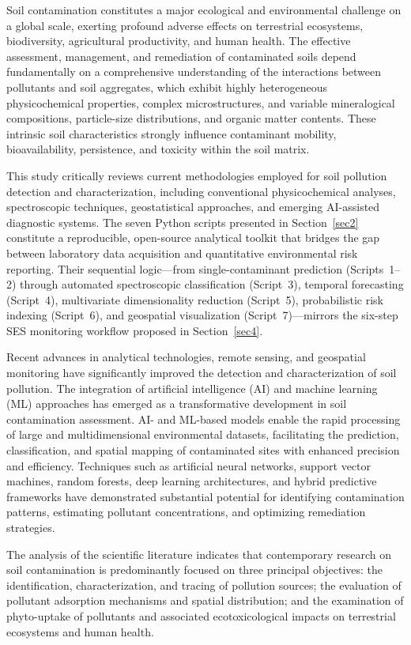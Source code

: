 \documentclass[land,article,submit,pdftex,moreauthors]{Definitions/mdpi}
\begin{document}
Soil contamination constitutes a major ecological and environmental challenge
on a global scale, exerting profound adverse effects on terrestrial
ecosystems, biodiversity, agricultural productivity, and human health. The
effective assessment, management, and remediation of contaminated soils depend
fundamentally on a comprehensive understanding of the interactions between
pollutants and soil aggregates, which exhibit highly heterogeneous
physicochemical properties, complex microstructures, and variable mineralogical
compositions, particle-size distributions, and organic matter contents. These
intrinsic soil characteristics strongly influence contaminant mobility,
bioavailability, persistence, and toxicity within the soil matrix.

This study critically reviews current methodologies employed for soil pollution
detection and characterization, including conventional physicochemical
analyses, spectroscopic techniques, geostatistical approaches, and emerging
AI-assisted diagnostic systems. The seven Python scripts presented in
Section~\ref{sec2} constitute a reproducible, open-source analytical toolkit
that bridges the gap between laboratory data acquisition and quantitative
environmental risk reporting. Their sequential logic---from single-contaminant
prediction (Scripts~1--2) through automated spectroscopic classification
(Script~3), temporal forecasting (Script~4), multivariate dimensionality
reduction (Script~5), probabilistic risk indexing (Script~6), and geospatial
visualization (Script~7)---mirrors the six-step SES monitoring workflow
proposed in Section~\ref{sec4}.

Recent advances in analytical technologies, remote sensing, and geospatial
monitoring have significantly improved the detection and characterization of
soil pollution. The integration of artificial intelligence (AI) and machine
learning (ML) approaches has emerged as a transformative development in soil
contamination assessment. AI- and ML-based models enable the rapid processing
of large and multidimensional environmental datasets, facilitating the
prediction, classification, and spatial mapping of contaminated sites with
enhanced precision and efficiency. Techniques such as artificial neural
networks, support vector machines, random forests, deep learning architectures,
and hybrid predictive frameworks have demonstrated substantial potential for
identifying contamination patterns, estimating pollutant concentrations, and
optimizing remediation strategies.

The analysis of the scientific literature indicates that contemporary research
on soil contamination is predominantly focused on three principal objectives:
the identification, characterization, and tracing of pollution sources; the
evaluation of pollutant adsorption mechanisms and spatial distribution; and the
examination of phyto-uptake of pollutants and associated ecotoxicological
impacts on terrestrial ecosystems and human health.
\end{document}
